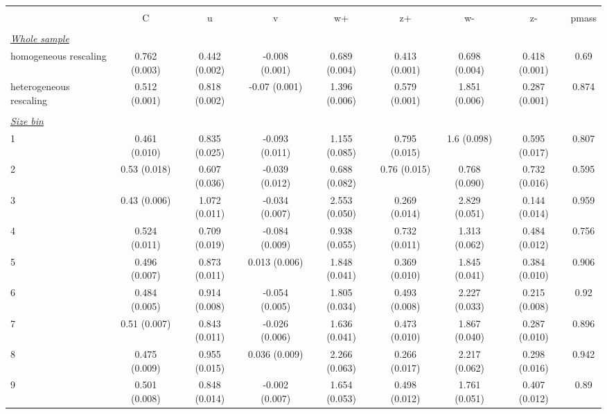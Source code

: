 
\begin{tabular}{@{\extracolsep{5pt}} l cccccccc} 
\\[-1.8ex]\hline 
\hline \\[-1.8ex] 
  & C & u & v & w+ & z+ & w- & z- & pmass \\ 
\hline \\[-1.8ex] 
\underline{{\it Whole sample}} &   &   &   &   &   &   &   &  \\ 
homogeneous rescaling & 0.762 (0.003) & 0.442 (0.002) & -0.008 (0.001) & 0.689 (0.004) & 0.413 (0.001) & 0.698 (0.004) & 0.418 (0.001) & 0.69 \\ 
heterogeneous rescaling & 0.512 (0.001) & 0.818 (0.002) & -0.07 (0.001) & 1.396 (0.006) & 0.579 (0.001) & 1.851 (0.006) & 0.287 (0.001) & 0.874 \\ 
 &   &   &   &   &   &   &   &  \\ 
\underline{{\it Size bin}} &   &   &   &   &   &   &   &  \\ 
1 & 0.461 (0.010) & 0.835 (0.025) & -0.093 (0.011) & 1.155 (0.085) & 0.795 (0.015) & 1.6 (0.098) & 0.595 (0.017) & 0.807 \\ 
2 & 0.53 (0.018) & 0.607 (0.036) & -0.039 (0.012) & 0.688 (0.082) & 0.76 (0.015) & 0.768 (0.090) & 0.732 (0.016) & 0.595 \\ 
3 & 0.43 (0.006) & 1.072 (0.011) & -0.034 (0.007) & 2.553 (0.050) & 0.269 (0.014) & 2.829 (0.051) & 0.144 (0.014) & 0.959 \\ 
4 & 0.524 (0.011) & 0.709 (0.019) & -0.084 (0.009) & 0.938 (0.055) & 0.732 (0.011) & 1.313 (0.062) & 0.484 (0.012) & 0.756 \\ 
5 & 0.496 (0.007) & 0.873 (0.011) & 0.013 (0.006) & 1.848 (0.041) & 0.369 (0.010) & 1.845 (0.041) & 0.384 (0.010) & 0.906 \\ 
6 & 0.484 (0.005) & 0.914 (0.008) & -0.054 (0.005) & 1.805 (0.034) & 0.493 (0.008) & 2.227 (0.033) & 0.215 (0.008) & 0.92 \\ 
7 & 0.51 (0.007) & 0.843 (0.011) & -0.026 (0.006) & 1.636 (0.041) & 0.473 (0.010) & 1.867 (0.040) & 0.287 (0.010) & 0.896 \\ 
8 & 0.475 (0.009) & 0.955 (0.015) & 0.036 (0.009) & 2.266 (0.063) & 0.266 (0.017) & 2.217 (0.062) & 0.298 (0.016) & 0.942 \\ 
9 & 0.501 (0.008) & 0.848 (0.014) & -0.002 (0.007) & 1.654 (0.053) & 0.498 (0.012) & 1.761 (0.051) & 0.407 (0.012) & 0.89 \\ 

\end{tabular}
